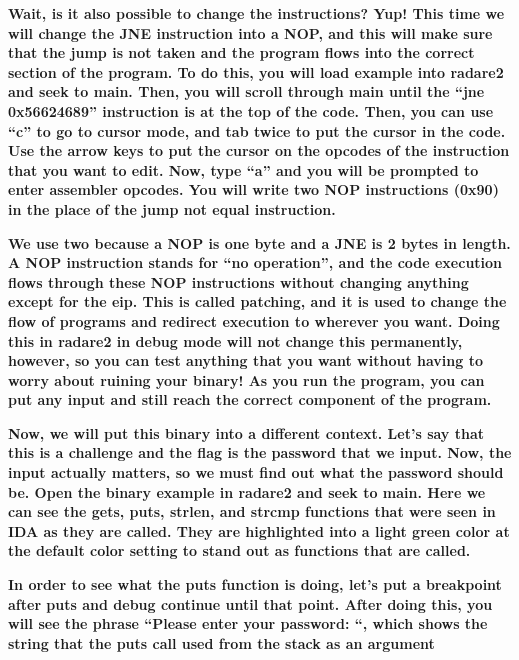 \documentclass[letterpaper]{article}
\newcommand{\sitfig}[3]{
\begin{figure}[H]
\centering
\makebox[\textwidth][c]{
#2
}
\label{#1}
\end{figure}
}
\newcommand{\sitgfx}[4][scale=1.0]{
\sitfig{#3}{\texttt{[image: \#2]}}{#4}
}
\begin{document}
\textbf{Wait, is it also possible to change the instructions? Yup! This time we will change the JNE instruction into a
NOP, and this will make sure that the jump is not taken and the program flows into the correct section of the program.
To do this, you will load example into radare2 and seek to main. Then, you will scroll through main until the ``jne
0x56624689'' instruction is at the top of the code. Then, you can use ``c'' to go to cursor mode, and tab twice to put
the cursor in the code. Use the arrow keys to put the cursor on the opcodes of the instruction that you want to edit.
Now, type ``a'' and you will be prompted to enter assembler opcodes.  You will write two NOP instructions (0x90) in the
place of the jump not equal instruction.}

  
\sitgfx[width=6.5in,height=4.0626in]{reversing-img056.png}{fig:unk}{TODO CAPTION}
 

  
\sitgfx[width=6.5in,height=4.0626in]{reversing-img057.png}{fig:unk}{TODO CAPTION}
 

\textbf{We use two because a NOP is one byte and a JNE is 2 bytes in length. A NOP instruction stands for ``no
operation'', and the code execution flows through these NOP instructions without changing anything except for the eip.
This is called patching, and it is used to change the flow of programs and redirect execution to wherever you want.
Doing this in radare2 in debug mode will not change this permanently, however, so you can test anything that you want
without having to worry about ruining your binary! As you run the program, you can put any input and still reach the
correct component of the program.}

\textbf{Now, we will put this binary into a different context. Let's say that this is a challenge and the flag is the
password that we input. Now, the input actually matters, so we must find out what the password should be. Open the
binary example in radare2 and seek to main. Here we can see the gets, puts, strlen, and strcmp functions that were seen
in IDA as they are called. They are highlighted into a light green color at the default color setting to stand out as
functions that are called.}

  
\sitgfx[width=6.5in,height=4.0626in]{reversing-img053.png}{fig:unk}{TODO CAPTION}
 

\textbf{In order to see what the puts function is doing, let's put a breakpoint after puts and debug continue until that
point. After doing this, you will see the phrase ``Please enter your password: ``, which shows the string that the puts
call used from the stack as an argument}
\end{document}
